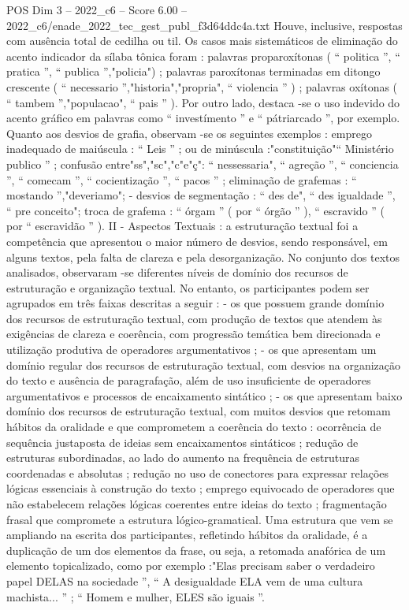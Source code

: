 \begin{textsample}{POS Dim 3 – 2022\_c6 – Score 6.00 – 2022\_c6/enade\_2022\_tec\_gest\_publ\_f3d64ddc4a.txt}
Houve, inclusive, respostas com ausência total de cedilha ou til.
Os casos mais sistemáticos de eliminação do acento indicador da sílaba tônica foram : palavras proparoxítonas ( “ politica ”, “ pratica ”, “ publica ”,"policia") ; palavras paroxítonas terminadas em ditongo crescente ( “ necessario ”,"historia","propria", “ violencia ” ) ; palavras oxítonas ( “ tambem ”,"populacao", “ pais ” ).
Por outro lado, destaca -se o uso indevido do acento gráfico em palavras como “ investímento ” e “ pátriarcado ”, por exemplo.
Quanto aos desvios de grafia, observam -se os seguintes exemplos : emprego inadequado de maiúscula : “ Leis ” ; ou de minúscula :"constituição"“ Ministério publico ” ; confusão entre"ss","sc","c"e"ç": “ nessessaria", “ agreção ”, “ conciencia ”, “ comecam ”, “ cocientização ”, “ pacos ” ; eliminação de grafemas : “ mostando ”,"deveriamo"; - desvios de segmentação : “ des de", “ des igualdade ”, “ pre conceito"; troca de grafema : “ órgam ” ( por “ órgão ” ), “ escravido ” ( por “ escravidão ” ).
II - Aspectos Textuais : a estruturação textual foi a competência que apresentou o maior número de desvios, sendo responsável, em alguns textos, pela falta de clareza e pela desorganização.
No conjunto dos textos analisados, observaram -se diferentes níveis de domínio dos recursos de estruturação e organização textual.
No entanto, os participantes podem ser agrupados em três faixas descritas a seguir : - os que possuem grande domínio dos recursos de estruturação textual, com produção de textos que atendem às exigências de clareza e coerência, com progressão temática bem direcionada e utilização produtiva de operadores argumentativos ; - os que apresentam um domínio regular dos recursos de estruturação textual, com desvios na organização do texto e ausência de paragrafação, além de uso insuficiente de operadores argumentativos e processos de encaixamento sintático ; - os que apresentam baixo domínio dos recursos de estruturação textual, com muitos desvios que retomam hábitos da oralidade e que comprometem a coerência do texto : ocorrência de sequência justaposta de ideias sem encaixamentos sintáticos ; redução de estruturas subordinadas, ao lado do aumento na frequência de estruturas coordenadas e absolutas ; redução no uso de conectores para expressar relações lógicas essenciais à construção do texto ; emprego equivocado de operadores que não estabelecem relações lógicas coerentes entre ideias do texto ; fragmentação frasal que compromete a estrutura lógico-gramatical.
Uma estrutura que vem se ampliando na escrita dos participantes, refletindo hábitos da oralidade, é a duplicação de um dos elementos da frase, ou seja, a retomada anafórica de um elemento topicalizado, como por exemplo :"Elas precisam saber o verdadeiro papel DELAS na sociedade ”, “ A desigualdade ELA vem de uma cultura machista... ” ; “ Homem e mulher, ELES são iguais ”.

\end{textsample}
